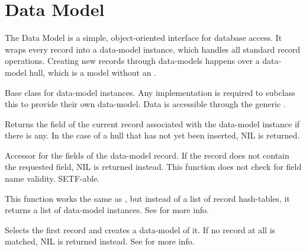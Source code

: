 \section{Data Model}
The Data Model is a simple, object-oriented interface for database access. It wraps every record into a data-model instance, which handles all standard record operations. Creating new records through data-models happens over a data-model hull, which is a model without an .

Base class for data-model instances. Any implementation is required to subclass this to provide their own data-model. Data is accessible through the generic .

Returns the  field of the current record associated with the data-model instance if there is any. In the case of a hull that has not yet been inserted, NIL is returned.

Accessor for the fields of the data-model record. If the record does not contain the requested field, NIL is returned instead. This function does not check for field name validity. SETF-able.

This function works the same as , but instead of a list of record hash-tables, it returns a list of data-model instances. See  for more info.

Selects the first record and creates a data-model of it. If no record at all is matched, NIL is returned instead. See  for more info.

